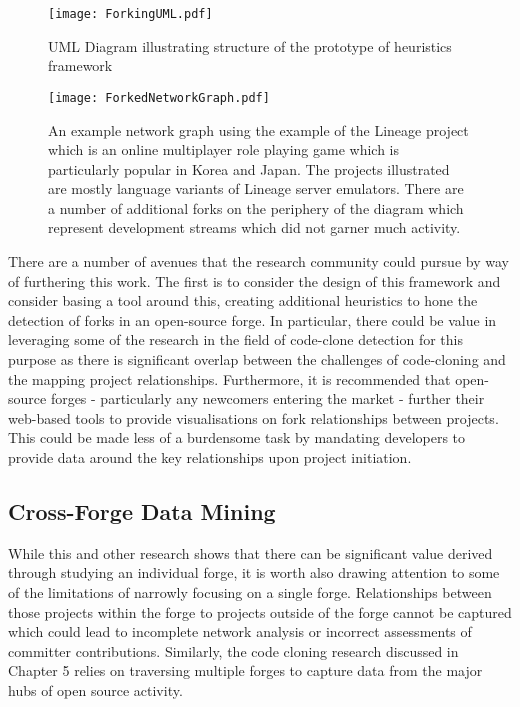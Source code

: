 \begin{figure}[htbp!] 
\centering    
\texttt{[image: ForkingUML.pdf]}
\caption{UML Diagram illustrating structure of the prototype of heuristics framework}
\label{fig:ForkingUML}
\end{figure}

\begin{figure}[htbp!] 
\centering    
\texttt{[image: ForkedNetworkGraph.pdf]}
\caption[An example network graph using the example of the Lineage project.]{An example network graph using the example of the Lineage project which is an online multiplayer role playing game which is particularly popular in Korea and Japan. The projects illustrated are mostly language variants of Lineage server emulators. There are a number of additional forks on the periphery of the diagram which represent development streams which did not garner much activity.}
\label{fig:ForkedNetworkGraph}
\end{figure}

There are a number of avenues that the research community could pursue by way of furthering this work. The first is to consider the design of this framework and consider basing a tool around this, creating additional heuristics to hone the detection of forks in an open-source forge. In particular, there could be value in leveraging some of the research in the field of code-clone detection for this purpose as there is significant overlap between the challenges of code-cloning and the mapping project relationships. Furthermore, it is recommended that open-source forges - particularly any newcomers entering the market - further their web-based tools to provide visualisations on fork relationships between projects. This could be made less of a burdensome task by mandating developers to provide data around the key relationships upon project initiation.

\subsection{Cross-Forge Data Mining}
While this and other research shows that there can be significant value derived through studying an individual forge, it is worth also drawing attention to some of the limitations of narrowly focusing on a single forge. Relationships between those projects within the forge to projects outside of the forge cannot be captured which could lead to incomplete network analysis or incorrect assessments of committer contributions. Similarly, the code cloning research discussed in Chapter 5 relies on traversing multiple forges to capture data from the major hubs of open source activity.

